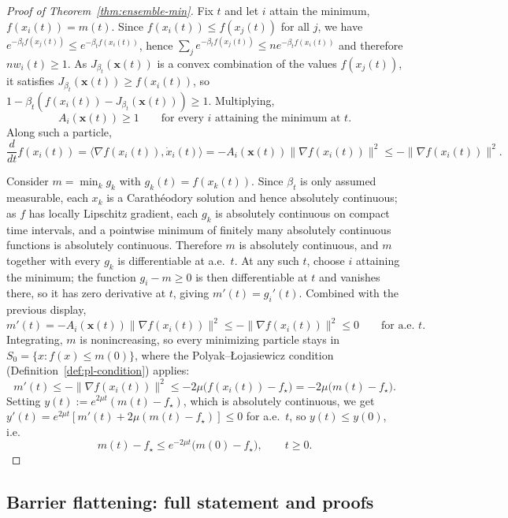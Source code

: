 \documentclass{opt2026} %
\providecommand{\qedhere}{}
\newcommand{\prefactor}[2]{A_{#1}(#2)}
\newcommand{\xx}{\mathbf{x}}
\begin{document}
\begin{proof}[Proof of Theorem~\ref{thm:ensemble-min}]
    Fix $t$ and let $i$ attain the minimum, $f(x_i(t))=m(t)$. Since $f(x_i(t))\le f(x_j(t))$ for all $j$, we have $e^{-\beta_tf(x_j(t))}\le e^{-\beta_tf(x_i(t))}$, hence $\sum_je^{-\beta_tf(x_j(t))}\le ne^{-\beta_tf(x_i(t))}$ and therefore $nw_i(t)\ge1$. As $J_{\beta_t}(\xx(t))$ is a convex combination of the values $f(x_j(t))$, it satisfies $J_{\beta_t}(\xx(t))\ge f(x_i(t))$, so $1-\beta_t(f(x_i(t))-J_{\beta_t}(\xx(t)))\ge1$. Multiplying,
    \begin{equation}
        \prefactor{i}{\xx(t)}\ge1 \qquad \text{for every } i \text{ attaining the minimum at } t.
        \label{eq:ai-ge-1}
    \end{equation}
    Along such a particle,
    \[
        \frac{d}{dt}f(x_i(t)) = \langle\nabla f(x_i(t)),\dot x_i(t)\rangle = -\prefactor{i}{\xx(t)}\|\nabla f(x_i(t))\|^2 \le -\|\nabla f(x_i(t))\|^2.
    \]

    Consider $m=\min_k g_k$ with $g_k(t)=f(x_k(t))$. Since $\beta_t$ is only assumed measurable, each $x_k$ is a Carath\'eodory solution and hence absolutely continuous; as $f$ has locally Lipschitz gradient, each $g_k$ is absolutely continuous on compact time intervals, and a pointwise minimum of finitely many absolutely continuous functions is absolutely continuous. Therefore $m$ is absolutely continuous, and $m$ together with every $g_k$ is differentiable at a.e.\ $t$. At any such $t$, choose $i$ attaining the minimum; the function $g_i-m\ge0$ is then differentiable at $t$ and vanishes there, so it has zero derivative at $t$, giving $m'(t)=g_i'(t)$. Combined with the previous display,
    \[
        m'(t)=-\prefactor{i}{\xx(t)}\|\nabla f(x_i(t))\|^2\le-\|\nabla f(x_i(t))\|^2\le0 \qquad \text{for a.e. } t.
    \]
    Integrating, $m$ is nonincreasing, so every minimizing particle stays in $S_0=\{x:f(x)\le m(0)\}$, where the Polyak--\L{}ojasiewicz condition (Definition~\ref{def:pl-condition}) applies:
    \[
        m'(t)\le-\|\nabla f(x_i(t))\|^2\le-2\mu\bigl(f(x_i(t))-f_\star\bigr)=-2\mu\bigl(m(t)-f_\star\bigr).
    \]
    Setting $y(t):=e^{2\mu t}(m(t)-f_\star)$, which is absolutely continuous, we get $y'(t)=e^{2\mu t}[m'(t)+2\mu(m(t)-f_\star)]\le0$ for a.e.\ $t$, so $y(t)\le y(0)$, i.e.
    \[
        m(t)-f_\star\le e^{-2\mu t}\bigl(m(0)-f_\star\bigr), \qquad t\ge0. \qedhere
    \]
\end{proof}

\subsection{Barrier flattening: full statement and proofs}
\label{apx:barrier-full}
\end{document}
